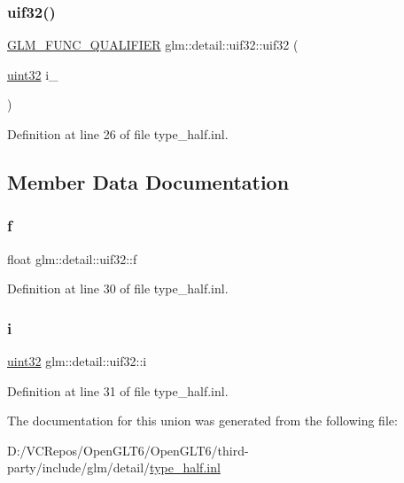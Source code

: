 \subsubsection{\texorpdfstring{uif32()}{uif32()}\hspace{0.1cm}{\footnotesize\ttfamily [3/3]}}
{\footnotesize\ttfamily \mbox{\hyperlink{setup_8hpp_a33fdea6f91c5f834105f7415e2a64407}{G\+L\+M\+\_\+\+F\+U\+N\+C\+\_\+\+Q\+U\+A\+L\+I\+F\+I\+ER}} glm\+::detail\+::uif32\+::uif32 (\begin{DoxyParamCaption}\item[{\mbox{\hyperlink{namespaceglm_1_1detail_ade6cfbf377022aaa391af8cd50489222}{uint32}}}]{i\+\_\+ }\end{DoxyParamCaption})\hspace{0.3cm}{\ttfamily [inline]}}



Definition at line 26 of file type\+\_\+half.\+inl.



\subsection{Member Data Documentation}
\mbox{\label{unionglm_1_1detail_1_1uif32_a5f697f84c5a8ec72c2f3a4f705f5bde8}} 
\subsubsection{\texorpdfstring{f}{f}}
{\footnotesize\ttfamily float glm\+::detail\+::uif32\+::f}



Definition at line 30 of file type\+\_\+half.\+inl.

\mbox{\label{unionglm_1_1detail_1_1uif32_a981c1c59e160db23c73908cd7e629229}} 
\subsubsection{\texorpdfstring{i}{i}}
{\footnotesize\ttfamily \mbox{\hyperlink{namespaceglm_1_1detail_ade6cfbf377022aaa391af8cd50489222}{uint32}} glm\+::detail\+::uif32\+::i}



Definition at line 31 of file type\+\_\+half.\+inl.



The documentation for this union was generated from the following file\+:\begin{DoxyCompactItemize}
\item 
D\+:/\+V\+C\+Repos/\+Open\+G\+L\+T6/\+Open\+G\+L\+T6/third-\/party/include/glm/detail/\mbox{\hyperlink{type__half_8inl}{type\+\_\+half.\+inl}}\end{DoxyCompactItemize}
